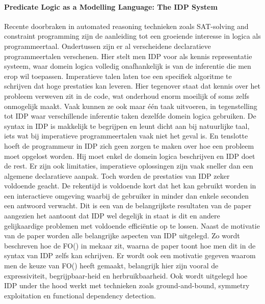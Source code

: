 \paragraph{Predicate Logic as a Modelling Language: The IDP System \cite{de2014predicate}}
Recente doorbraken in automated reasoning technieken zoals SAT-solving and constraint programming zijn de aanleiding tot een groeiende interesse in logica als programmeertaal. Ondertussen zijn er al verscheidene declaratieve programmeertalen verschenen. Hier stelt men IDP voor als kennis representatie systeem, waar domein logica volledig onafhankelijk is van de inferentie die men erop wil toepassen. Imperatieve talen laten toe een specifiek algoritme te schrijven dat hoge prestaties kan leveren. Hier tegenover staat dat kennis over het probleem verweven zit in de code, wat onderhoud enorm moeilijk of soms zelfs onmogelijk maakt. Vaak kunnen ze ook maar \'{e}\'{e}n taak uitvoeren, in tegenstelling tot IDP waar verschillende inferentie taken dezelfde domein logica gebruiken. De syntax in IDP is makkelijk te begrijpen en leunt dicht aan bij natuurlijke taal, iets wat bij imperatieve programmeertalen vaak niet het geval is. En tenslotte hoeft de programmeur in IDP zich geen zorgen te maken over hoe een probleem moet opgelost worden. Hij moet enkel de domein logica beschrijven en IDP doet de rest. 
Er zijn ook limitaties, imperatieve oplossingen zijn vaak sneller dan een algemene declaratieve aanpak. Toch worden de prestaties van IDP zeker voldoende geacht. De rekentijd is voldoende kort dat het kan gebruikt worden in een interactieve omgeving waarbij de gebruiker in minder dan enkele seconden een antwoord verwacht. Dit is een van de belangrijkste resultaten van de paper aangezien het aantoont dat IDP wel degelijk in staat is dit en andere gelijkaardige problemen met voldoende effici\"{e}ntie op te lossen. Naast de motivatie van de paper worden alle belangrijke aspecten van IDP uitgelegd. Zo wordt beschreven hoe de FO(\textperiodcentered) in mekaar zit, waarna de paper toont hoe men dit in de syntax van IDP zelfs kan schrijven. Er wordt ook een motivatie gegeven waarom men de keuze van FO(\textperiodcentered) heeft gemaakt, belangrijk hier zijn vooral de expressiviteit, begrijpbaar-heid en herbruikbaarheid. Ook wordt uitgelegd hoe IDP under the hood werkt met technieken zoals ground-and-bound, symmetry exploitation en functional dependency detection.


